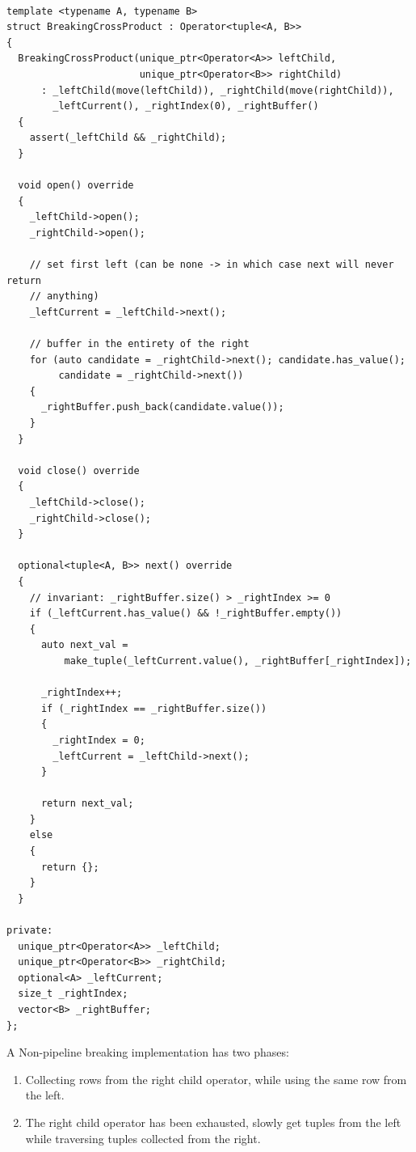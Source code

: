 \begin{verbatim}

template <typename A, typename B>
struct BreakingCrossProduct : Operator<tuple<A, B>>
{
  BreakingCrossProduct(unique_ptr<Operator<A>> leftChild,
                       unique_ptr<Operator<B>> rightChild)
      : _leftChild(move(leftChild)), _rightChild(move(rightChild)),
        _leftCurrent(), _rightIndex(0), _rightBuffer()
  {
    assert(_leftChild && _rightChild);
  }

  void open() override
  {
    _leftChild->open();
    _rightChild->open();

    // set first left (can be none -> in which case next will never return
    // anything)
    _leftCurrent = _leftChild->next();

    // buffer in the entirety of the right
    for (auto candidate = _rightChild->next(); candidate.has_value();
         candidate = _rightChild->next())
    {
      _rightBuffer.push_back(candidate.value());
    }
  }

  void close() override
  {
    _leftChild->close();
    _rightChild->close();
  }

  optional<tuple<A, B>> next() override
  {
    // invariant: _rightBuffer.size() > _rightIndex >= 0
    if (_leftCurrent.has_value() && !_rightBuffer.empty())
    {
      auto next_val =
          make_tuple(_leftCurrent.value(), _rightBuffer[_rightIndex]);

      _rightIndex++;
      if (_rightIndex == _rightBuffer.size())
      {
        _rightIndex = 0;
        _leftCurrent = _leftChild->next();
      }

      return next_val;
    }
    else
    {
      return {};
    }
  }

private:
  unique_ptr<Operator<A>> _leftChild;
  unique_ptr<Operator<B>> _rightChild;
  optional<A> _leftCurrent;
  size_t _rightIndex;
  vector<B> _rightBuffer;
};
\end{verbatim}
A Non-pipeline breaking implementation has two phases:
\begin{enumerate}
    \item Collecting rows from the right child operator, while using the same row from the left.
    \item The right child operator has been exhausted, slowly get tuples from the left while traversing tuples collected from the right.
\end{enumerate}
